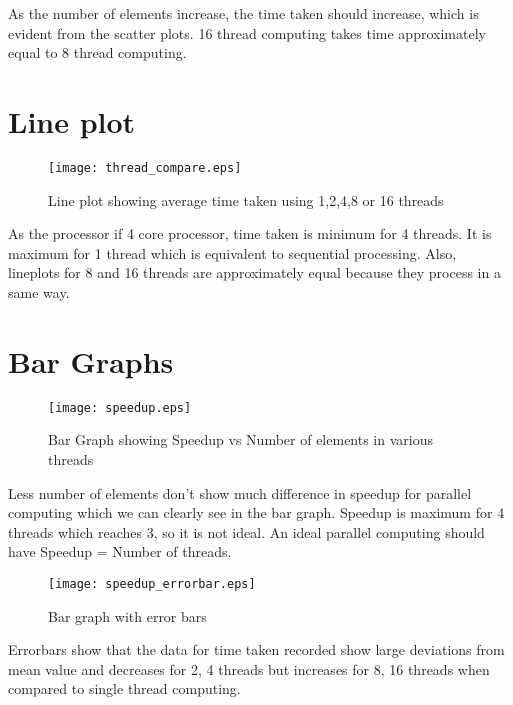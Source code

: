 \documentclass[a4paper, 14pt]{report}
\begin{document}
\vskip 0.5in
{\Large As the number of elements increase, the time taken should increase, which is evident from the scatter plots. 16 thread computing takes time approximately equal to 8 thread computing.}

\chapter{Line plot}

\begin{figure}[H]
\centering
\texttt{[image: thread\_compare.eps]}
 \caption{Line plot showing average time taken using 1,2,4,8 or 16 threads}
\end{figure}

\vskip 0.5in
{\Large As the processor if 4 core processor, time taken is minimum for 4 threads. It is maximum for 1 thread which is equivalent to sequential processing. Also, lineplots for 8 and 16 threads are approximately equal because they process in a same way.}

\chapter{Bar Graphs}

\begin{figure}[H]
\centering
\texttt{[image: speedup.eps]}
 \caption{Bar Graph showing Speedup vs Number of elements in various threads}
\end{figure}

\vskip 0.5in
{\Large Less number of elements don't show much difference in speedup for parallel computing which we can clearly see in the bar graph. Speedup is maximum for 4 threads which reaches 3, so it is not ideal. An ideal parallel computing should have Speedup = Number of threads.}

\begin{figure}[H]
\centering
\texttt{[image: speedup\_errorbar.eps]}
 \caption{Bar graph with error bars}
\end{figure}

\vskip 0.5in
\noindent
{\Large Errorbars show that the data for time taken recorded show large deviations from mean value and decreases for 2, 4 threads but increases for 8, 16 threads when compared to single thread computing.}
\end{document}
